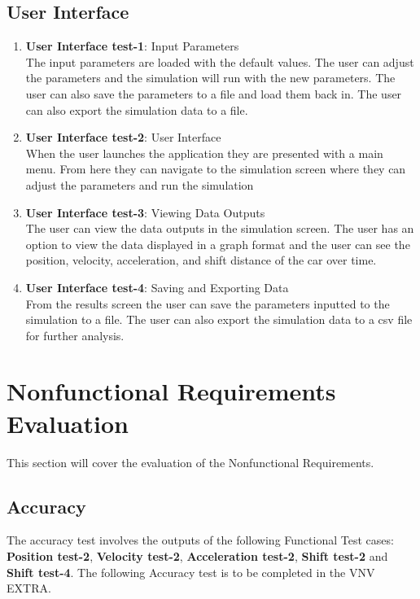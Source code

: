 \documentclass[12pt, titlepage]{article}
\begin{document}
\subsection{User Interface}
\begin{enumerate}
\item{\textbf{User Interface test-1}: Input Parameters}\\
The input parameters are loaded with the default values. The user can adjust the parameters and the simulation will run with the new parameters. The user can also save the parameters to a file and load them back in. The user can also export the simulation data to a file.
\item{\textbf{User Interface test-2}: User Interface}\\
When the user launches the application they are presented with a main menu. From here they can navigate to the simulation screen where they can adjust the parameters and run the simulation
\item{\textbf{User Interface test-3}: Viewing Data Outputs}\\
The user can view the data outputs in the simulation screen. The user has an option to view the data displayed in a graph format and the user can see the position, velocity, acceleration, and shift distance of the car over time.
\item{\textbf{User Interface test-4}: Saving and Exporting Data}\\
From the results screen the user can save the parameters inputted to the simulation to a file. The user can also export the simulation data to a csv file for further analysis.
\end{enumerate}

\section{Nonfunctional Requirements Evaluation}

This section will cover the evaluation of the Nonfunctional Requirements. 

\subsection{Accuracy}

The accuracy test involves the outputs of the following Functional Test cases: \textbf{Position test-2}, \textbf{Velocity test-2}, \textbf{Acceleration test-2}, \textbf{Shift test-2} and \textbf{Shift test-4}. 
The following Accuracy test is to be completed in the VNV EXTRA. 
\end{document}
